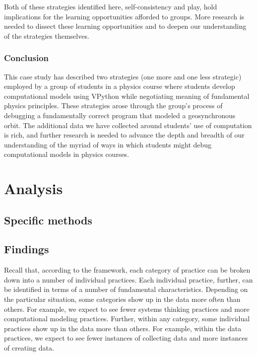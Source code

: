 \documentclass{msuphddissertation}
\begin{document}
\begin{doublespace}
Both of these strategies identified here, self-consistency and play, hold implications for the learning opportunities afforded to groups.  More research is needed to dissect these learning opportunities and to deepen our understanding of the strategies themselves.
\vspace*{0.2in}
\subsection{Conclusion}

This case study has described two strategies (one more and one less strategic) employed by a group of students in a physics course where students develop computational models using VPython while negotiating meaning of fundamental physics principles. These strategies arose through the group's process of debugging a fundamentally correct program that modeled a geosynchronous orbit. The additional data we have collected around students' use of computation is rich, and further research is needed to advance the depth and breadth of our understanding of the myriad of ways in which students might debug computational models in physics courses.


\chapter{Analysis}

\section{Specific methods}

\section{Findings}

Recall that, according to the framework, each category of practice can be broken down into a number of individual practices.  Each individual practice, further, can be identified in terms of a number of fundamental characteristics.  Depending on the particular situation, some categories show up in the data more often than others.  For example, we expect to see fewer systems thinking practices and more computational modeling practices.  Further, within any category, some individual practices show up in the data more than others.  For example, within the data practices, we expect to see fewer instances of collecting data and more instances of creating data.


\end{doublespace}
\end{document}
